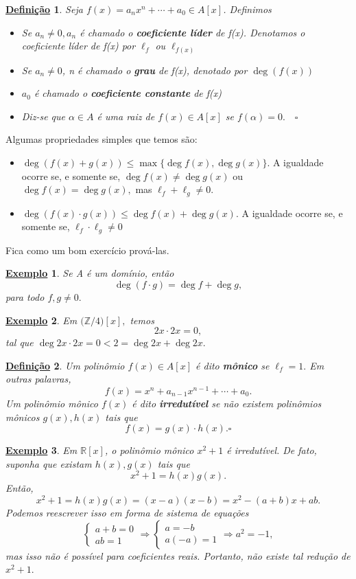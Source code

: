 \documentclass{article}
\newtheorem*{def*}{\underline{Defini\c c\~ao}}
\newtheorem{example}{\underline{Exemplo}}
\begin{document}
\begin{def*}
  Seja \(f(x) = a_{n}x^{n} + \cdots + a_{0}\in A[x]\). Definimos
  \begin{itemize}
    \item[1)] Se \(a_{n}\neq0, a_{n}\) é chamado o \textbf{coeficiente líder} de f(x). Denotamos o coeficiente líder
      de f(x) por \(\ell_{f}\) ou \(\ell_{f(x)}\)
    \item[2)] Se \(a_{n}\neq0\), n é chamado o \textbf{grau} de f(x), denotado por \(\deg(f(x))\)
    \item[3)] \(a_{0}\) é chamado o \textbf{coeficiente constante} de f(x)
    \item[4)] Diz-se que \(\alpha\in A\) é uma raiz de \(f(x)\in A[x]\) se \(f(\alpha ) = 0.\quad\square\)
  \end{itemize}
\end{def*}
Algumas propriedades simples que temos são:
\begin{itemize}
  \item[i)] \(\deg{(f(x) + g(x))}\leq \max\{\deg{f(x)}, \deg{g(x)}\}\). A igualdade ocorre se, e somente se,
    \(\deg{f(x)}\neq \deg{g(x)}\) ou \(\deg{f(x)}=\deg{g(x)},\) mas \(\ell_{f} + \ell_{g}\neq0.\)
  \item[2)] \(\deg{(f(x)\cdot g(x))}\leq \deg{f(x)} + \deg{g(x)}.\) A igualdade ocorre se, e somente se,
    \(\ell_{f}\cdot \ell_{g} \neq0\)
\end{itemize}
Fica como um bom exercício prová-las.
\begin{example}
  Se A é um domínio, então 
  \[
    \deg{(f \cdot g)} = \deg{f} + \deg{g},
  \]
  para todo \(f, g\neq0.\)
\end{example}
\begin{example}
  Em \(\biggl(\mathbb{Z}/4\biggr)[x],\) temos 
  \[
    2x \cdot 2x = 0,
  \]
  tal que \(\deg{2x \cdot 2x} = 0 < 2 = \deg{2x} + \deg{2x}.\)
\end{example}
\begin{def*}
  Um polinômio \(f(x)\in A[x]\) é dito \textbf{mônico} se \(\ell_{f} = 1.\) Em outras palavras, 
  \[
    f(x) = x^{n} + a_{n-1}x^{n-1} + \cdots + a_{0}.
  \]
  Um polinômio mônico \(f(x)\) é dito \textbf{irredutível} se não existem polinômios mônicos
  \(g(x), h(x)\) tais que 
  \[
    f(x) = g(x)\cdot h(x).\square
  \]
\end{def*}
\begin{example}
  Em \(\mathbb{R}[x]\), o polinômio mônico \(x^{2} + 1\) é irredutível. De fato, suponha que existam 
  \(h(x), g(x)\) tais que 
  \[
    x^{2} + 1 = h(x)g(x).
  \]
  Então,
  \[
    x^{2} + 1 = h(x)g(x) = (x-a)(x-b) = x^{2} - (a+b)x +ab.
  \]
  Podemos reescrever isso em forma de sistema de equações 
  \[
    \left\{\begin{array}{ll}
        a + b = 0\\
        ab = 1
    \end{array}\right. 
    \Rightarrow  
    \left\{\begin{array}{ll}
        a = -b\\
        a(-a) = 1
    \end{array}\right.
    \Rightarrow 
    a^{2} = -1,
  \]
  mas isso não é possível para coeficientes reais. Portanto, não existe tal redução de \(x^{2} + 1.\)
\end{example}
\end{document}
